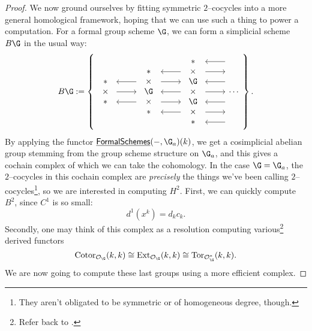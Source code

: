 \begin{proof}
We now ground ourselves by fitting symmetric $2$--cocycles into a more general homological framework, hoping that we can use such a thing to power a computation.  For a formal group scheme $\G$, we can form a simplicial scheme $B\G$ in the usual way:
\[B\G := \left\{
\begin{tikzcd}[ampersand replacement=\&]
\begin{array}{c} * \\ \times \\ * \end{array} \arrow{r} \arrow[leftarrow,shift left=\baselineskip]{r} \arrow[leftarrow,shift right=\baselineskip]{r} \&
\begin{array}{c} * \\ \times \\ \G \\ \times \\ * \end{array} \arrow[leftarrow, shift left=(2*\baselineskip)]{r} \arrow[shift left=\baselineskip]{r} \arrow[leftarrow]{r} \arrow[shift right=\baselineskip]{r} \arrow[leftarrow, shift right=(2*\baselineskip)]{r} \&
\begin{array}{c} * \\ \times \\ \G \\ \times \\ \G \\ \times \\ *\end{array} \arrow[leftarrow, shift left=(3*\baselineskip)]{r} \arrow[shift left=(2*\baselineskip)]{r} \arrow[leftarrow, shift left=\baselineskip]{r} \arrow{r} \arrow[leftarrow, shift right=\baselineskip]{r} \arrow[shift right=(2*\baselineskip)]{r} \arrow[leftarrow, shift right=(3*\baselineskip)]{r} \&
\cdots
\end{tikzcd}
\right\}.\]
By applying the functor $\InternalHom{FormalSchemes}(-, \G_a)(k)$, we get a cosimplicial abelian group stemming from the group scheme structure on $\G_a$, and this gives a cochain complex of which we can take the cohomology.  In the case $\G = \G_a$, the $2$--cocycles in this cochain complex are \emph{precisely} the things we've been calling $2$--cocycles\footnote{They aren't obligated to be symmetric or of homogeneous degree, though.}, so we are interested in computing $H^2$.  First, we can quickly compute $B^2$, since $C^1$ is so small: \[d^1(x^k) = d_k c_k.\]  Secondly, one may think of this complex as a resolution computing various\footnote{Refer back to .} derived functors \[\Cotor_{\sheaf O_{\G}}(k, k) \cong \Ext_{\sheaf O_{\G}}(k, k) \cong \Tor_{\sheaf O_{\G}^*}(k, k).\]  We are now going to compute these last groups using a more efficient complex.


\end{proof}
